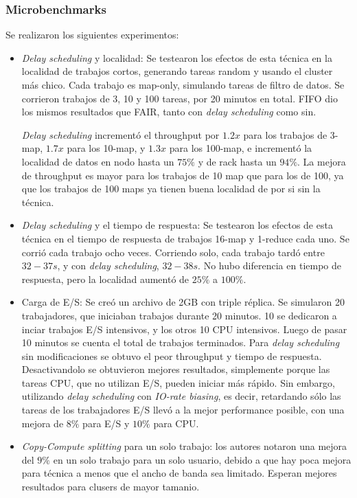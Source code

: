 \subsubsection{Microbenchmarks}

Se realizaron los siguientes experimentos:

\begin{itemize}

\item \emph{Delay scheduling} y localidad: Se testearon los efectos de esta t\'ecnica en la localidad de trabajos cortos, generando tareas random y usando el cluster m\'as chico. Cada trabajo es map-only, simulando tareas de filtro de datos. Se corrieron trabajos de 3, 10 y 100 tareas, por 20 minutos en total. FIFO dio los mismos resultados que FAIR, tanto con \emph{delay scheduling} como sin.

\emph{Delay scheduling} increment\'o el throughput por $1.2x$ para los trabajos de 3-map, $1.7x$ para los 10-map, y $1.3x$ para los 100-map, e increment\'o la localidad de datos en nodo hasta un $75\%$ y de rack hasta un $94\%$. La mejora de throughput es mayor para los trabajos de 10 map que para los de 100, ya que los trabajos de 100 maps ya tienen buena localidad de por si sin la t\'ecnica.

\item \emph{Delay scheduling} y el tiempo de respuesta: Se testearon los efectos de esta t\'ecnica en el tiempo de respuesta de trabajos 16-map y 1-reduce cada uno. Se corri\'o cada trabajo ocho veces. Corriendo solo, cada trabajo tard\'o entre $32-37s$, y con \emph{delay scheduling}, $32-38s$. No hubo diferencia en tiempo de respuesta, pero la localidad aument\'o de $25\%$ a $100\%$.

\item Carga de E/S: Se cre\'o un archivo de 2GB con triple r\'eplica. Se simularon 20 trabajadores, que iniciaban trabajos durante 20 minutos. 10 se dedicaron a inciar trabajos E/S intensivos, y los otros 10 CPU intensivos. Luego de pasar 10 minutos se cuenta el total de trabajos terminados. Para \emph{delay scheduling} sin modificaciones se obtuvo el peor throughput y tiempo de respuesta. Desactivandolo se obtuvieron mejores resultados, simplemente porque las tareas CPU, que no utilizan E/S, pueden iniciar m\'as r\'apido. Sin embargo, utilizando \emph{delay scheduling} con \emph{IO-rate biasing}, es decir, retardando s\'olo las tareas de los trabajadores E/S llev\'o a la mejor performance posible, con una mejora de $8\%$ para E/S y $10\%$ para CPU.

\item \emph{Copy-Compute splitting} para un solo trabajo: los autores notaron una mejora del $9\%$ en un solo trabajo para un solo usuario, debido a que hay poca mejora para t\'ecnica a menos que el ancho de banda sea limitado. Esperan mejores resultados para clusers de mayor tamanio.

\end{itemize}

